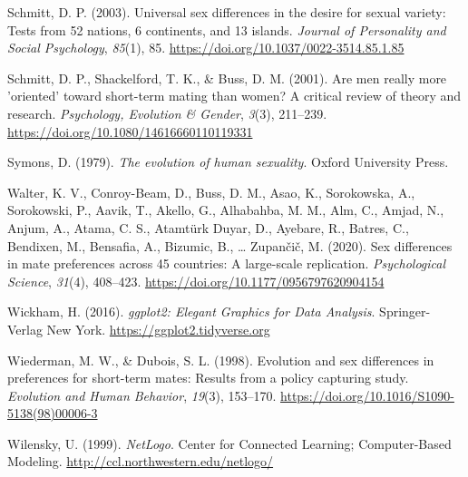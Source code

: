 \documentclass[
  11pt,
]{article}
\newlength{\cslhangindent}
\newlength{\cslentryspacingunit} %
\newenvironment{CSLReferences}[2] %
 {%
  \setlength{\parindent}{0pt}
  \ifodd #1
  \let\oldpar\par
  \def\par{\hangindent=\cslhangindent\oldpar}
  \fi
  \setlength{\parskip}{#2\cslentryspacingunit}
 }%
 {}
\begin{document}
\begin{CSLReferences}{1}{0}
\leavevmode{}%
Schmitt, D. P. (2003). Universal sex differences in the desire for
sexual variety: Tests from 52 nations, 6 continents, and 13 islands.
\emph{Journal of Personality and Social Psychology}, \emph{85}(1), 85.
\url{https://doi.org/10.1037/0022-3514.85.1.85}

\leavevmode{}%
Schmitt, D. P., Shackelford, T. K., \& Buss, D. M. (2001). Are men
really more 'oriented' toward short-term mating than women? A critical
review of theory and research. \emph{Psychology, Evolution \& Gender},
\emph{3}(3), 211--239. \url{https://doi.org/10.1080/14616660110119331}

\leavevmode{}%
Symons, D. (1979). \emph{The evolution of human sexuality}. Oxford
University Press.

\leavevmode{}%
Walter, K. V., Conroy-Beam, D., Buss, D. M., Asao, K., Sorokowska, A.,
Sorokowski, P., Aavik, T., Akello, G., Alhabahba, M. M., Alm, C., Amjad,
N., Anjum, A., Atama, C. S., Atamtürk Duyar, D., Ayebare, R., Batres,
C., Bendixen, M., Bensafia, A., Bizumic, B., \ldots{} Zupančič, M.
(2020). Sex differences in mate preferences across 45 countries: A
large-scale replication. \emph{Psychological Science}, \emph{31}(4),
408--423. \url{https://doi.org/10.1177/0956797620904154}

\leavevmode{}%
Wickham, H. (2016). \emph{{ggplot2: Elegant Graphics for Data
Analysis}}. Springer-Verlag New York.
\url{https://ggplot2.tidyverse.org}

\leavevmode{}%
Wiederman, M. W., \& Dubois, S. L. (1998). Evolution and sex differences
in preferences for short-term mates: Results from a policy capturing
study. \emph{Evolution and Human Behavior}, \emph{19}(3), 153--170.
\url{https://doi.org/10.1016/S1090-5138(98)00006-3}

\leavevmode{}%
Wilensky, U. (1999). \emph{NetLogo}. Center for Connected Learning;
Computer-Based Modeling. \url{http://ccl.northwestern.edu/netlogo/}

\end{CSLReferences}
\end{document}

